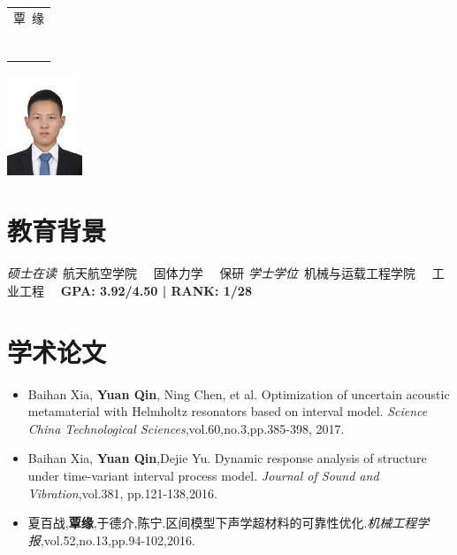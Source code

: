 \documentclass{resume}
\begin{document}

\medskip\noindent
\begin{minipage}{0.7\textwidth}
  \large{
    \begin{tabu}  { l }

      \Huge{\scshape{覃\ 缘}} \\
\ \\
       \\
    \end{tabu}
  }
\end{minipage}
\begin{minipage}{0.3\textwidth}
  \raggedleft
  \includegraphics[height=30mm]{me}
\end{minipage}

%


\section{教育背景}
\textit{硕士在读}\ 航天航空学院 \ \   固体力学 \ \ 保研
\textit{学士学位}\ 机械与运载工程学院 \ \  工业工程 \ \ \textbf{\textsc{GPA}: 3.92/4.50 | \textsc{RANK}: 1/28	}


\section{学术论文}
\begin{itemize} 
	 \item Baihan Xia, \textbf{Yuan Qin}, Ning Chen, et al. Optimization of uncertain acoustic metamaterial with Helmholtz resonators based on interval model. \textit{Science China Technological Sciences},vol.60,no.3,pp.385-398, 2017.
	 \item Baihan Xia, \textbf{Yuan Qin},Dejie Yu. Dynamic response analysis of structure under time-variant interval process model. \textit{Journal of Sound and Vibration},vol.381, pp.121-138,2016.
   \item 夏百战,\textbf{覃缘},于德介,陈宁.区间模型下声学超材料的可靠性优化.\textit{机械工程学报},vol.52,no.13,pp.94-102,2016.
  \end{itemize}
\end{document}
